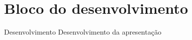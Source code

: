 \section{Bloco do desenvolvimento}
\begin{frame}{Desenvolvimento}
  Desenvolvimento da apresentação
\end{frame}